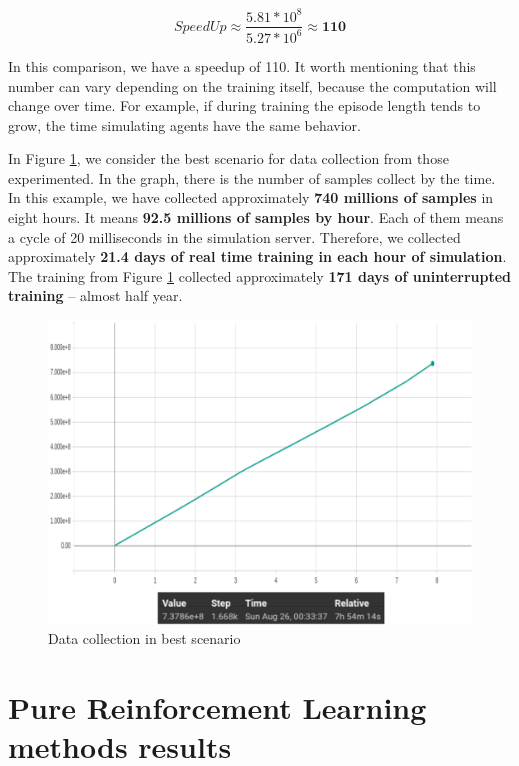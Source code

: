 \begin{equation}
	SpeedUp \approx \frac{5.81 * 10^{8}}{5.27 * 10^{6}} \approx \textbf{110}
\end{equation}

In this comparison, we have a speedup of 110. It worth mentioning that this number can vary depending on the training itself, because the computation will change over time. For example, if during training the episode length tends to grow, the time simulating agents have the same behavior.


In Figure \ref{fig:absdatacollection}, we consider the best scenario for data collection from those experimented. In the graph, there is the number of samples collect by the time.
In this example, we have collected approximately \textbf{740 millions of samples} in eight hours. It means \textbf{92.5 millions of samples by hour}. Each of them means a cycle of 20 milliseconds in the simulation server. Therefore, we collected approximately \textbf{21.4 days of real time training in each hour of simulation}. The training from Figure \ref{fig:absdatacollection} collected approximately \textbf{171 days of uninterrupted training} -- almost half year.

\begin{figure}[!htbp]
	\centering
	\includegraphics[width=1\textwidth]{Cap6/absolutedatacollection}
	\caption{Data collection in best scenario}
	\label{fig:absdatacollection}
\end{figure}



\section{Pure Reinforcement Learning methods results}

